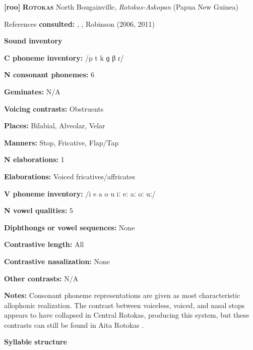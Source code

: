 \textbf{[roo]}   \textbf{\textsc{Rotokas}}  North Bougainville, \textit{Rotokas-Askopan} (Papua New Guinea)



References \textbf{consulted:} \citet{FirchowFirchow1969}, \citet{FirchowEtAl1973}, Robinson (2006, 2011) 



\textbf{Sound inventory}



\textbf{C phoneme inventory:} /p t k ɡ β ɾ/



\textbf{N consonant phonemes:} 6



\textbf{Geminates:} N/A



\textbf{Voicing contrasts:} Obstruents



\textbf{Places:} Bilabial, Alveolar, Velar



\textbf{Manners:} Stop, Fricative, Flap/Tap



\textbf{N elaborations:} 1



\textbf{Elaborations:} Voiced fricatives/affricates



\textbf{V phoneme inventory:} /i e a o u iː eː aː oː uː/



\textbf{N vowel qualities:} 5



\textbf{Diphthongs or vowel sequences:} None



\textbf{Contrastive length:} All



\textbf{Contrastive nasalization:} None



\textbf{Other contrasts:} N/A



\textbf{Notes:} Consonant phoneme representations are given as most characteristic allophonic realization. The contrast between voiceless, voiced, and nasal stops appears to have collapsed in Central Rotokas, producing this system, but these contrasts can still be found in Aita Rotokas \citep{Robinson2006}.



\textbf{Syllable structure}



